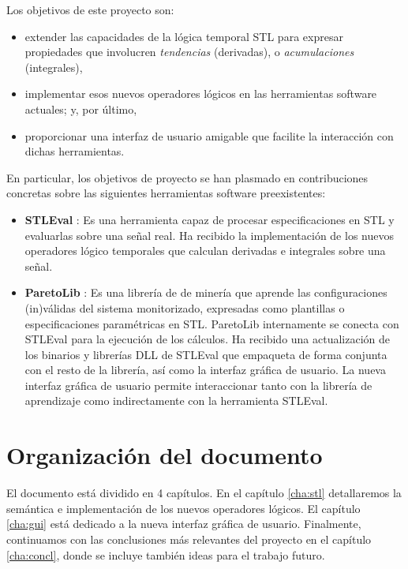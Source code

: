 Los objetivos de este proyecto son:

\begin{itemize}
\item extender las capacidades de la lógica temporal STL para expresar propiedades que involucren \textit{tendencias} (derivadas), o \textit{acumulaciones} (integrales),    
\item implementar esos nuevos operadores lógicos en las herramientas software actuales; y, por último,
\item proporcionar una interfaz de usuario amigable que facilite la interacción con dichas herramientas.  
\end{itemize}

En particular, los objetivos de proyecto se han plasmado en contribuciones concretas sobre las siguientes herramientas software preexistentes:

\begin{itemize}
\item \textbf{STLEval} \cite{StlEval}: Es una herramienta capaz de procesar especificaciones en STL y evaluarlas sobre una señal real. Ha recibido la implementación de los nuevos operadores lógico temporales que calculan derivadas e integrales sobre una señal.
\item \textbf{ParetoLib} \cite{ParetoLib}: Es una librería de de minería que aprende las configuraciones (in)válidas del sistema monitorizado, expresadas como plantillas o especificaciones paramétricas en STL. ParetoLib internamente se conecta con STLEval para la ejecución de los cálculos. Ha recibido una actualización de los binarios y librerías DLL de STLEval que empaqueta de forma conjunta con el resto de la librería, así como la interfaz gráfica de usuario. La nueva interfaz gráfica de usuario permite interaccionar tanto con la librería de aprendizaje como indirectamente con la herramienta STLEval.
\end{itemize}

\section{Organización del documento}

El documento está dividido en 4 capítulos. En el capítulo \ref{cha:stl} detallaremos la semántica e implementación de los nuevos operadores lógicos. El capítulo \ref{cha:gui} está dedicado a la nueva interfaz gráfica de usuario. Finalmente, continuamos con las conclusiones más relevantes del proyecto en el capítulo \ref{cha:concl}, donde se incluye también ideas para el trabajo futuro. %

